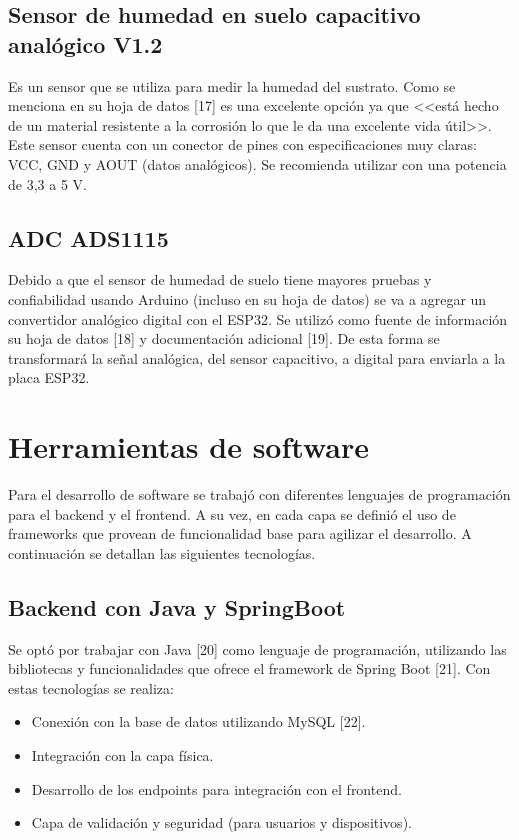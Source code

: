 \subsection{Sensor de humedad en suelo capacitivo analógico V1.2}
Es un sensor que se utiliza para medir la humedad del sustrato. Como se menciona en su hoja de datos [17] es una excelente opción ya que <<está hecho de un material resistente a la corrosión lo que le da una excelente vida útil>>. Este sensor cuenta con un conector de pines con especificaciones muy claras: VCC, GND y AOUT (datos analógicos). Se recomienda utilizar con una potencia de 3,3 a 5 V.

\subsection{ADC ADS1115}
Debido a que el sensor de humedad de suelo tiene mayores pruebas y confiabilidad usando Arduino (incluso en su hoja de datos) se va a agregar un convertidor analógico digital con el ESP32. Se utilizó como fuente de información su hoja de datos [18] y documentación adicional [19]. De esta forma se transformará la señal analógica, del sensor capacitivo, a digital para enviarla a la placa ESP32.


\section{Herramientas de software}

Para el desarrollo de software se trabajó con diferentes lenguajes de programación para el backend y el frontend. A su vez, en cada capa se definió el uso de frameworks que provean de funcionalidad base para agilizar el desarrollo. A continuación se detallan  las siguientes tecnologías.

\subsection{Backend con Java y SpringBoot}
Se optó por trabajar con Java [20] como lenguaje de programación, utilizando las bibliotecas y funcionalidades que ofrece el framework de Spring Boot [21]. Con estas tecnologías se realiza:
\begin{itemize}
\item Conexión con la base de datos utilizando MySQL [22].
\item Integración con la capa física.
\item Desarrollo de los endpoints para integración con el frontend.
\item Capa de validación y seguridad (para usuarios y dispositivos).
\end{itemize}

